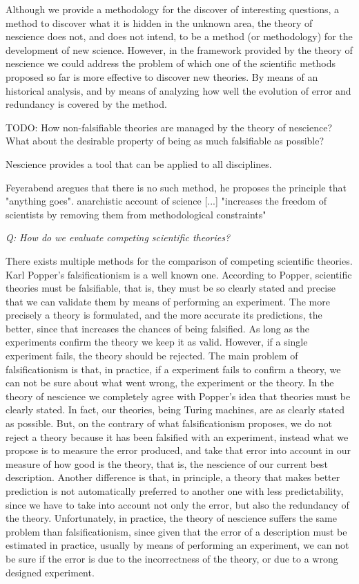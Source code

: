 Although we provide a methodology for the discover of interesting questions, a method to discover what it is hidden in the unknown area, the theory of nescience does not, and does not intend, to be a method (or methodology) for the development of new science. However, in the framework provided by the theory of nescience we could address the problem of which one of the scientific methods proposed so far is more effective to discover new theories. By means of an historical analysis, and by means of analyzing how well the evolution of error and redundancy is covered by the method.

{\color{red} TODO: How non-falsifiable theories are managed by the theory of nescience? What about the desirable property of being as much falsifiable as possible?}

Nescience provides a tool that can be applied to all disciplines. 

Feyerabend aregues that there is no such method, he proposes the principle that "anything goes". anarchistic account of science [...] "increases the freedom of scientists by removing them from methodological constraints"

\emph{Q: How do we evaluate competing scientific theories?}

There exists multiple methods for the comparison of competing scientific theories. Karl Popper's falsificationism is a well known one. According to Popper, scientific theories must be falsifiable, that is, they must be so clearly stated and precise that we can validate them by means of performing an experiment. The more precisely a theory is formulated, and the more accurate its predictions, the better, since that increases the chances of being falsified. As long as the experiments confirm the theory we keep it as valid. However, if a single experiment fails, the theory should be rejected. The main problem of falsificationism is that, in practice, if a experiment fails to confirm a theory, we can not be sure about what went wrong, the experiment or the theory. In the theory of nescience we completely agree with Popper's idea that theories must be clearly stated. In fact, our theories, being Turing machines, are as clearly stated as possible. But, on the contrary of what falsificationism proposes, we do not reject a theory because it has been falsified with an experiment, instead what we propose is to measure the error produced, and take that error into account in our measure of how good is the theory, that is, the nescience of our current best description. Another difference is that, in principle, a theory that makes better prediction is not automatically preferred to another one with less predictability, since we have to take into account not only the error, but also the redundancy of the theory. Unfortunately, in practice, the theory of nescience suffers the same problem than falsificationism, since given that the error of a description must be estimated in practice, usually by means of performing an experiment, we can not be sure if the error is due to the incorrectness of the theory, or due to a wrong designed experiment.

